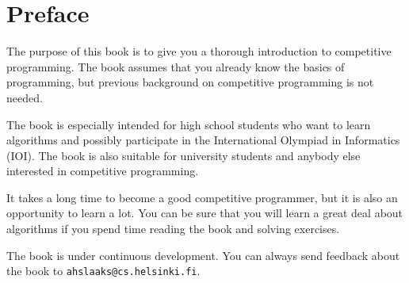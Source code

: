 \chapter*{Preface}

The purpose of this book is to give you
a thorough introduction to competitive programming.
The book assumes that you already
know the basics of programming, but previous
background on competitive programming is not needed.

The book is especially intended for
high school students who want to learn
algorithms and possibly participate in
the International Olympiad in Informatics (IOI).
The book is also suitable for university students
and anybody else interested in competitive programming.

It takes a long time to become a good competitive
programmer, but it is also an opportunity to learn a lot.
You can be sure that you will learn a great deal
about algorithms if you spend time reading the book
and solving exercises.

The book is under continuous development.
You can always send feedback about the book to
\texttt{ahslaaks@cs.helsinki.fi}.
